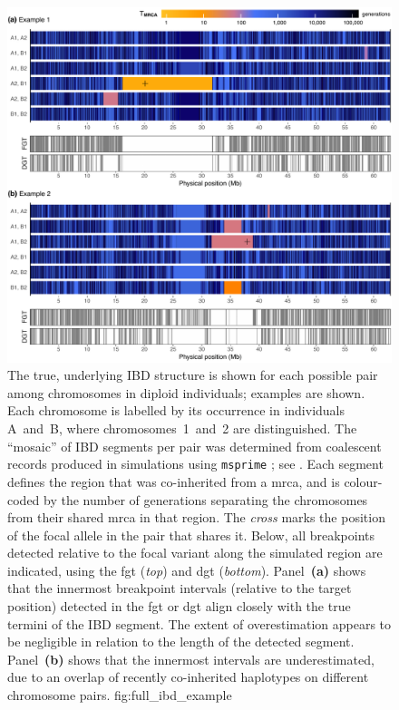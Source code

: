 

\begin{figure}[!htbp]
\includegraphics[width=\textwidth]{./img/ch3/full_ibd_example}
{The true, underlying IBD structure is shown for each possible pair among  chromosomes in  diploid individuals;  examples are shown.
Each chromosome is labelled by its occurrence in individuals A~and~B, where chromosomes~1~and~2 are distinguished.
The ``mosaic'' of IBD segments per pair was determined from coalescent records produced in simulations using \texttt{msprime} \citep{Kelleher:2016fn}; see .
Each segment defines the region that was co-inherited from a \gls{mrca}, and is colour-coded by the number of generations separating the  chromosomes from their shared \gls{mrca} in that region.
The \emph{cross} marks the position of the focal allele in the pair that shares it.
Below, all breakpoints detected relative to the focal variant along the simulated region are indicated, using the \gls{fgt} (\emph{top}) and \gls{dgt} (\emph{bottom}).
Panel~\textbf{(a)} shows that the innermost breakpoint intervals (relative to the target position) detected in the \gls{fgt} or \gls{dgt} align closely with the true termini of the IBD segment.
The extent of overestimation appears to be negligible in relation to the length of the detected segment.
Panel~\textbf{(b)} shows that the innermost intervals are underestimated, due to an overlap of recently co-inherited haplotypes on different chromosome pairs.}
{fig:full_ibd_example}
\end{figure}
